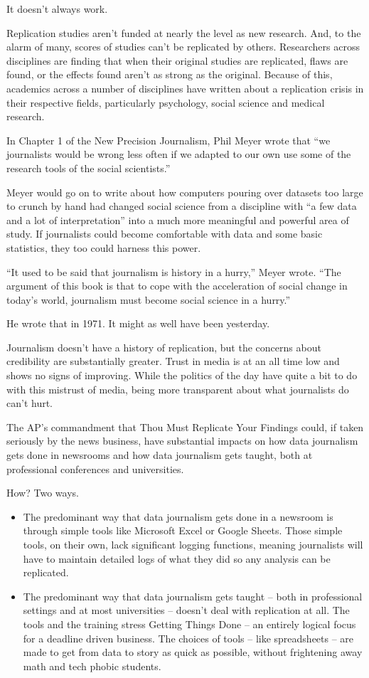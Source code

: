 \documentclass[]{book}
\providecommand{\tightlist}{%
  \setlength{\itemsep}{0pt}\setlength{\parskip}{0pt}}
\begin{document}
It doesn't always work.

Replication studies aren't funded at nearly the level as new research. And, to the alarm of many, scores of studies can't be replicated by others. Researchers across disciplines are finding that when their original studies are replicated, flaws are found, or the effects found aren't as strong as the original. Because of this, academics across a number of disciplines have written about a replication crisis in their respective fields, particularly psychology, social science and medical research.

In Chapter 1 of the New Precision Journalism, Phil Meyer wrote that ``we journalists would be wrong less often if we adapted to our own use some of the research tools of the social scientists.''

Meyer would go on to write about how computers pouring over datasets too large to crunch by hand had changed social science from a discipline with ``a few data and a lot of interpretation'' into a much more meaningful and powerful area of study. If journalists could become comfortable with data and some basic statistics, they too could harness this power.

``It used to be said that journalism is history in a hurry,'' Meyer wrote. ``The argument of this book is that to cope with the acceleration of social change in today's world, journalism must become social science in a hurry.''

He wrote that in 1971. It might as well have been yesterday.

Journalism doesn't have a history of replication, but the concerns about credibility are substantially greater. Trust in media is at an all time low and shows no signs of improving. While the politics of the day have quite a bit to do with this mistrust of media, being more transparent about what journalists do can't hurt.

The AP's commandment that Thou Must Replicate Your Findings could, if taken seriously by the news business, have substantial impacts on how data journalism gets done in newsrooms and how data journalism gets taught, both at professional conferences and universities.

How? Two ways.

\begin{itemize}
\tightlist
\item
  The predominant way that data journalism gets done in a newsroom is through simple tools like Microsoft Excel or Google Sheets. Those simple tools, on their own, lack significant logging functions, meaning journalists will have to maintain detailed logs of what they did so any analysis can be replicated.
\item
  The predominant way that data journalism gets taught -- both in professional settings and at most universities -- doesn't deal with replication at all. The tools and the training stress Getting Things Done -- an entirely logical focus for a deadline driven business. The choices of tools -- like spreadsheets -- are made to get from data to story as quick as possible, without frightening away math and tech phobic students.
\end{itemize}
\end{document}
